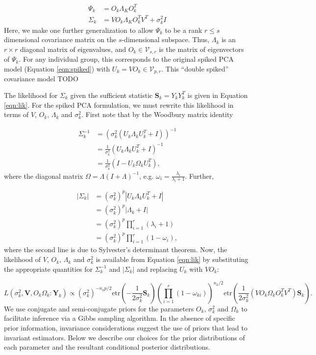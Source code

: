 \documentclass[12pt]{article}
\newcommand{\bl}[1]{{\mathbf #1}}
\newcommand{\etr}{\text{etr}}
\begin{document}
\begin{align}
\nonumber \Psi_k &= O_k\Lambda_KO_k^T\\
\Sigma_k &= VO_k\Lambda_KO_k^TV^T + \sigma^2_kI
\label{eqn:ss}
\end{align}
%
\noindent Here, we make one further generalization to allow
$\Psi_k$ to be a rank $r \leq s$ dimensional covariance
matrix on the $s$-dimensional subspace.  Thus, $\Lambda_k$ is an $r \times
r$ diagonal matrix of eigenvalues, and $O_k \in
\mathcal{V}_{s,r}$ is the matrix of eigenvectors of
$\Psi_k$.  For any individual group, this corresponds to the original spiked
PCA model (Equation \ref{eqn:spiked}) with $U_k = VO_k \in
\mathcal{V}_{p, r}$.    This ``double spiked'' covariance model TODO

The likelihood for $\Sigma_k$ given the sufficient statistic
$\mathbf{S}_k = Y_kY_k^T$ is given in Equation \ref{eqn:lik}.  For the
spiked PCA formulation, we must rewrite this likelihood in terms of $V$, $O_k$,
$\Lambda_k$ and $\sigma_k^2$.  First note that by the Woodbury matrix
identity
 
\begin{align}
\nonumber \Sigma^{-1}_k &=  (\sigma_k^2(U_k\Lambda_kU_k^T+I))^{-1}\\
\nonumber &= \frac{1}{\sigma_k^2}(U_k\Lambda_kU_k^T+I)^{-1}\\
&= \frac{1}{\sigma_k^2}(I-U_k\Omega_kU_k^T),
\end{align}
%
\noindent where the diagonal matrix $\Omega = \Lambda(I+\Lambda)^{-1}$, e.g. $\omega_i = \frac{\lambda_i}{\lambda_{i}+1}$.  Further, 

\begin{align}
\nonumber |\Sigma_k| &= (\sigma_k^2)^{p}|U_k\Lambda_kU_k^T+I|\\
\nonumber &= (\sigma_k^2)^{p}|\Lambda_k+I| \\
\nonumber &= (\sigma_k^2)^{p}\prod_{i=1}^r(\lambda_i+1)\\
&= (\sigma_k^2)^{p}\prod_{i=1}^r(1-\omega_i),
\end{align}
%
\noindent where the second line is due to Sylvester's determinant
theorem.  Now, the likelihood of $V$, $O_k$, $\Lambda_k$ and
$\sigma_k^2$ is available from Equation \ref{eqn:lik} by substituting
the appropriate quantities for $\Sigma^{-1}_k$ and $|\Sigma_k|$ and
replacing $U_k$ with $VO_k$:

\begin{equation}
 L(\sigma_k^2,\bl V , O_k \Omega_k : \bl Y_k) \propto
    (\sigma_k^2)^{-n_kp/2}\etr(-\frac{1}{2\sigma_k^2}\mathbf{S}_k)\left(\prod_{i=1}^r(1-\omega_{ki})
   \right) ^{n_k/2}
   \etr(\frac{1}{2\sigma_k^2}(VO_k\Omega_kO_k^TV^T)\mathbf{S}_k).
\label{eqn:sslik}
\end{equation}
%
\noindent We use conjugate and semi-conjugate priors for the parameters $O_k$,
$\sigma^2_k$ and $\Omega_k$ to facilitate inference via a Gibbs
sampling algorithm.  In the absence of specific prior information,
invariance considerations suggest the use of priors that lead to
invariant estimators.  Below we describe our choices for the prior
distributions of each parameter and the resultant conditional posterior
distributions.
\end{document}
